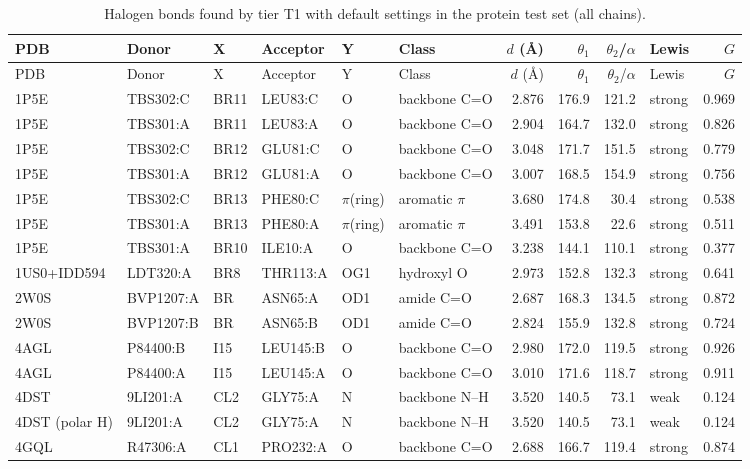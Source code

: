 \documentclass[journal=jcisd8,manuscript=suppinfo]{achemso}
\begin{document}
\begin{singlespace}
{\scriptsize
\setlength{\tabcolsep}{3pt}
\begin{longtable}{lllllp{1.9cm}rrrlr}
\caption{Halogen bonds found by tier T1 with default settings in the protein test set (all chains).}\label{tab:protT1}\\
\toprule
PDB & Donor & X & Acceptor & Y & Class & $d$ (\AA) & $\theta_1$ & $\theta_2$/$\alpha$ & Lewis & $G$\\
\midrule
\endfirsthead
\toprule
PDB & Donor & X & Acceptor & Y & Class & $d$ (\AA) & $\theta_1$ & $\theta_2$/$\alpha$ & Lewis & $G$\\
\midrule
\endhead
\bottomrule
\endlastfoot
1P5E & TBS302:C & BR11 & LEU83:C & O & backbone C=O & 2.876 & 176.9 & 121.2 & strong & 0.969\\
1P5E & TBS301:A & BR11 & LEU83:A & O & backbone C=O & 2.904 & 164.7 & 132.0 & strong & 0.826\\
1P5E & TBS302:C & BR12 & GLU81:C & O & backbone C=O & 3.048 & 171.7 & 151.5 & strong & 0.779\\
1P5E & TBS301:A & BR12 & GLU81:A & O & backbone C=O & 3.007 & 168.5 & 154.9 & strong & 0.756\\
1P5E & TBS302:C & BR13 & PHE80:C & $\pi$(ring) & aromatic $\pi$ & 3.680 & 174.8 & 30.4 & strong & 0.538\\
1P5E & TBS301:A & BR13 & PHE80:A & $\pi$(ring) & aromatic $\pi$ & 3.491 & 153.8 & 22.6 & strong & 0.511\\
1P5E & TBS301:A & BR10 & ILE10:A & O & backbone C=O & 3.238 & 144.1 & 110.1 & strong & 0.377\\
1US0+IDD594 & LDT320:A & BR8 & THR113:A & OG1 & hydroxyl O & 2.973 & 152.8 & 132.3 & strong & 0.641\\
2W0S & BVP1207:A & BR & ASN65:A & OD1 & amide C=O & 2.687 & 168.3 & 134.5 & strong & 0.872\\
2W0S & BVP1207:B & BR & ASN65:B & OD1 & amide C=O & 2.824 & 155.9 & 132.8 & strong & 0.724\\
4AGL & P84400:B & I15 & LEU145:B & O & backbone C=O & 2.980 & 172.0 & 119.5 & strong & 0.926\\
4AGL & P84400:A & I15 & LEU145:A & O & backbone C=O & 3.010 & 171.6 & 118.7 & strong & 0.911\\
4DST & 9LI201:A & CL2 & GLY75:A & N & backbone N--H & 3.520 & 140.5 & 73.1 & weak & 0.124\\
4DST (polar H) & 9LI201:A & CL2 & GLY75:A & N & backbone N--H & 3.520 & 140.5 & 73.1 & weak & 0.124\\
4GQL & R47306:A & CL1 & PRO232:A & O & backbone C=O & 2.688 & 166.7 & 119.4 & strong & 0.874\\
\end{longtable}}


\end{singlespace}
\end{document}
